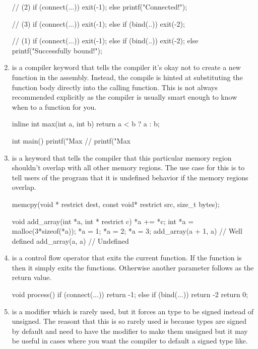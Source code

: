 \begin{enumerate}
\begin{code}[language=C]
// (2)
if (connect(...)) {
  exit(-1);
} else {
  printf("Connected!");
}

// (3)
if (connect(...)) {
  exit(-1);
} else if (bind(..)) {
  exit(-2);
}

// (1)
if (connect(...)) {
  exit(-1);
} else if (bind(..)) {
  exit(-2);
} else {
  printf("Successfully bound!");
}
\end{code}

\item {} is a compiler keyword that tells the compiler it's okay not to create a new function in the assembly. Instead, the compile is hinted at substituting the function body directly into the calling function. This is not always recommended explicitly as the compiler is usually smart enough to know when to  a function for you.

\begin{code}[language=C]
inline int max(int a, int b) {
  return a < b ? a : b;
}

int main() {
  printf("Max %
  // printf("Max %
}
\end{code}

\item {} is a keyword that tells the compiler that this particular memory region shouldn't overlap with all other memory regions. The use case for this is to tell users of the program that it is undefined behavior if the memory regions overlap.

\begin{code}[language=C]
memcpy(void * restrict dest, const void* restrict src, size_t bytes);

void add_array(int *a, int * restrict c) {
  *a += *c;
}
int *a = malloc(3*sizeof(*a));
*a = 1; *a = 2; *a = 3;
add_array(a + 1, a) // Well defined
add_array(a, a) // Undefined
\end{code}
\item {} is a control flow operator that exits the current function. If the function is  then it simply exits the functions. Otherwise another parameter follows as the return value.

\begin{code}[language=C]
void process() {
  if (connect(...)) {
    return -1;
  } else if (bind(...)) {
    return -2
  }
  return 0;
}
\end{code}

\item {} is a modifier which is rarely used, but it forces an type to be signed instead of unsigned. The reasont that this is so rarely used is because types are signed by default and need to have the  modifier to make them unsigned but it may be useful in cases where you want the compiler to default a signed type like.


\end{enumerate}
